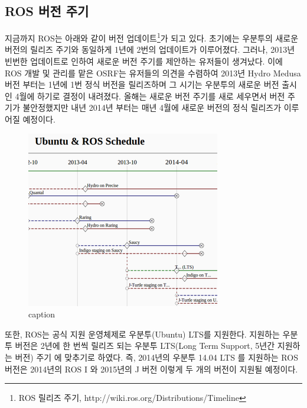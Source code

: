 \subsection{ROS 버전 주기}

지금까지 ROS는 아래와 같이 버전 업데이트\footnote{ROS 릴리즈 주기, http://wiki.ros.org/Distributions/Timeline}가 되고 있다. 초기에는 우분투의 새로운 버전의 릴리즈 주기와 동일하게 1년에 2번의 업데이트가 이루어졌다. 그러나, 2013년 빈번한 업데이트로 인하여 새로운 버전 주기를 제안하는 유저들이 생겨났다. 이에 ROS 개발 및 관리를 맡은 OSRF는 유저들의 의견을 수렴하여 2013년 Hydro Medusa 버전 부터는 1년에 1번 정식 버전을 릴리즈하며 그 시기는 우분투의 새로운 버전 출시인 4월에 하기로 결정이 내려졌다. 올해는 새로운 버전 주기를 새로 세우면서 버전 주기가 불안정했지만 내년 2014년 부터는 매년 4월에 새로운 버전의 정식 릴리즈가 이루어질 예정이다.

\begin{figure}[h]
\centering\includegraphics[width=0.5\columnwidth]{pictures/chapter1/ros_timeline.png}
\caption{caption}
\end{figure}

또한, ROS는 공식 지원 운영체제로 우분투(Ubuntu) LTS를 지원한다. 지원하는 우분투 버전은 2년에 한 번씩 릴리즈 되는 우분투 LTS(Long Term Support, 5년간 지원하는 버전) 주기 에 맞추기로 하였다. 즉, 2014년의 우분투 14.04 LTS 를 지원하는 ROS 버전은 2014년의 ROS I 와 2015년의 J 버전 이렇게 두 개의 버전이 지원될 예정이다.

